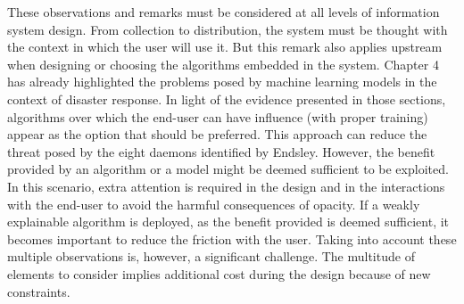 These observations and remarks must be considered at all levels of information system design.
From collection to distribution, the system must be thought with the context in which the user will use it.
But this remark also applies upstream when designing or choosing the algorithms embedded in the system.
Chapter 4 has already highlighted the problems posed by machine learning models in the context of disaster response.
In light of the evidence presented in those sections, algorithms over which the end-user can have influence (with proper training) appear as the option that should be preferred.
This approach can reduce the threat posed by the eight daemons identified by Endsley.
However, the benefit provided by an algorithm or a model might be deemed sufficient to be exploited.
In this scenario, extra attention is required in the design and in the interactions with the end-user to avoid the harmful consequences of opacity.
If a weakly explainable algorithm is deployed, as the benefit provided is deemed sufficient, it becomes important to reduce the friction with the user.
Taking into account these multiple observations is, however, a significant challenge.
The multitude of elements to consider implies additional cost during the design because of new constraints.

